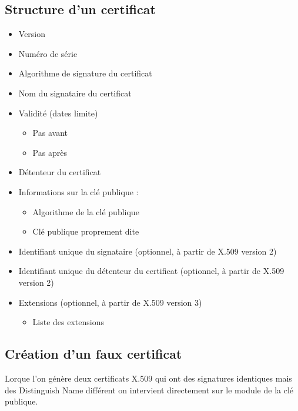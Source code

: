 \documentclass[a4paper,11pt,french]{article}
\begin{document}
\subsection{Structure d'un certificat}

\begin{itemize}
\item Version
\item Numéro de série
\item Algorithme de signature du certificat
\item Nom du signataire du certificat
\item Validité (dates limite) 
  \begin{itemize} 
  \item Pas avant
  \item Pas après
  \end{itemize}
\item Détenteur du certificat
\item Informations sur la clé publique :
  \begin{itemize}
  \item Algorithme de la clé publique
  \item Clé publique proprement dite
  \end{itemize}
\item Identifiant unique du signataire (optionnel, à partir de X.509 version 2)
\item Identifiant unique du détenteur du certificat (optionnel, à partir de X.509 version 2)
\item Extensions (optionnel, à partir de X.509 version 3)
  \begin{itemize}
  \item Liste des extensions
  \end{itemize}
\end{itemize}


\subsection{Création d'un faux certificat}
Lorque l'on génère deux certificats X.509 qui ont des signatures identiques mais des Distinguish Name différent on intervient directement sur le module de la clé publique.
\end{document}

